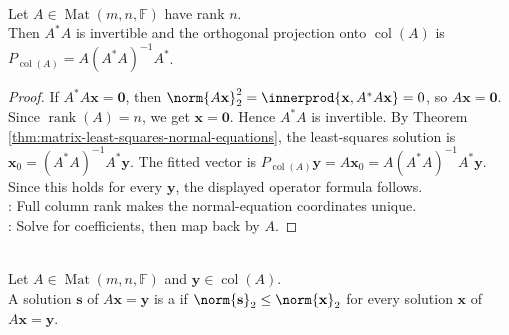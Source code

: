 \begin{corollary} \label{cor:full-column-rank-projection-formula} \\
Let $A\in\operatorname{Mat}(m,n,\mathbb{F})$ have rank $n$.\\
Then $A^*A$ is invertible and the orthogonal projection onto $\operatorname{col}(A)$ is $P_{\operatorname{col}(A)}=A(A^*A)^{-1}A^*$.
\begin{proof}
If $A^*A\mathbf{x}=\mathbf{0}$, then $\norm{A\mathbf{x}}_2^2=\innerprod{\mathbf{x},A^*A\mathbf{x}}=0$, so $A\mathbf{x}=\mathbf{0}$.\\
Since $\operatorname{rank}(A)=n$, we get $\mathbf{x}=\mathbf{0}$. Hence $A^*A$ is invertible. By Theorem \ref{thm:matrix-least-squares-normal-equations}, the least-squares solution is $\mathbf{x}_0=(A^*A)^{-1}A^*\mathbf{y}$. The fitted vector is $P_{\operatorname{col}(A)}\mathbf{y}=A\mathbf{x}_0=A(A^*A)^{-1}A^*\mathbf{y}$.\\
Since this holds for every $\mathbf{y}$, the displayed operator formula follows.\\
: Full column rank makes the normal-equation coordinates unique.\\
: Solve for coefficients, then map back by $A$.
\end{proof}
\end{corollary}

\begin{definition} \label{def:minimum-norm-solution} \\
Let $A\in\operatorname{Mat}(m,n,\mathbb{F})$ and $\mathbf{y}\in\operatorname{col}(A)$.\\
A solution $\mathbf{s}$ of $A\mathbf{x}=\mathbf{y}$ is a  if $\norm{\mathbf{s}}_2\leq\norm{\mathbf{x}}_2$ for every solution $\mathbf{x}$ of $A\mathbf{x}=\mathbf{y}$.
\end{definition}

